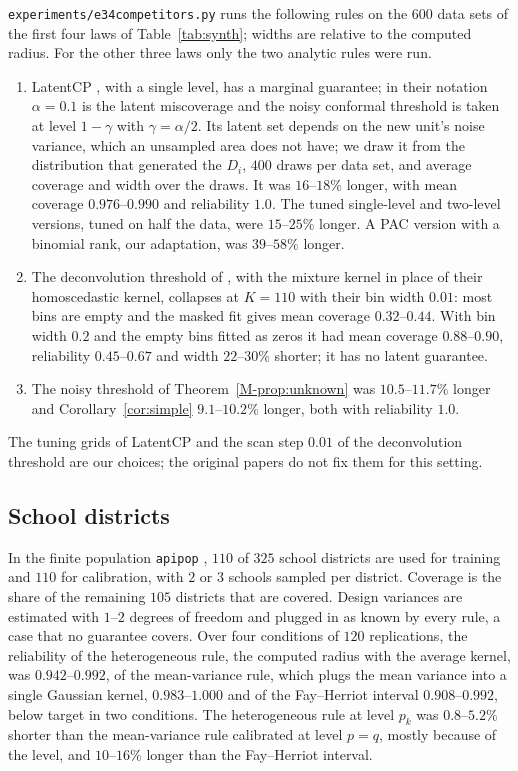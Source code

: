 \documentclass[11pt]{article}
\renewcommand{\_}{\usc\allowbreak}
\begin{document}
\texttt{experiments/e34\_competitors.py} runs the following rules on the $600$ data sets of the first four laws of Table~\ref{tab:synth}; widths are relative to the computed radius. For the other three laws only the two analytic rules were run.
\begin{enumerate}
\item LatentCP \citep{zheng2026}, with a single level, has a marginal guarantee; in their notation $\alpha = 0.1$ is the latent miscoverage and the noisy conformal threshold is taken at level $1 - \gamma$ with $\gamma = \alpha/2$. Its latent set depends on the new unit's noise variance, which an unsampled area does not have; we draw it from the distribution that generated the $D_i$, $400$ draws per data set, and average coverage and width over the draws. It was $16$--$18\%$ longer, with mean coverage $0.976$--$0.990$ and reliability $1.0$. The tuned single-level and two-level versions, tuned on half the data, were $15$--$25\%$ longer. A PAC version with a binomial rank, our adaptation, was $39$--$58\%$ longer.
\item The deconvolution threshold of \citet{cohen2025}, with the mixture kernel in place of their homoscedastic kernel, collapses at $K = 110$ with their bin width $0.01$: most bins are empty and the masked fit gives mean coverage $0.32$--$0.44$. With bin width $0.2$ and the empty bins fitted as zeros it had mean coverage $0.88$--$0.90$, reliability $0.45$--$0.67$ and width $22$--$30\%$ shorter; it has no latent guarantee.
\item The noisy threshold of Theorem~\ref{M-prop:unknown} was $10.5$--$11.7\%$ longer and Corollary~\ref{cor:simple} $9.1$--$10.2\%$ longer, both with reliability $1.0$.
\end{enumerate}
The tuning grids of LatentCP and the scan step $0.01$ of the deconvolution threshold are our choices; the original papers do not fix them for this setting.

\subsection*{School districts}

In the finite population \texttt{apipop} \citep{lumley2004}, $110$ of $325$ school districts are used for training and $110$ for calibration, with $2$ or $3$ schools sampled per district. Coverage is the share of the remaining $105$ districts that are covered. Design variances are estimated with $1$--$2$ degrees of freedom and plugged in as known by every rule, a case that no guarantee covers. Over four conditions of $120$ replications, the reliability of the heterogeneous rule, the computed radius with the average kernel, was $0.942$--$0.992$, of the mean-variance rule, which plugs the mean variance into a single Gaussian kernel, $0.983$--$1.000$ and of the Fay--Herriot interval $0.908$--$0.992$, below target in two conditions. The heterogeneous rule at level $p_k$ was $0.8$--$5.2\%$ shorter than the mean-variance rule calibrated at level $p = q$, mostly because of the level, and $10$--$16\%$ longer than the Fay--Herriot interval.
\end{document}
